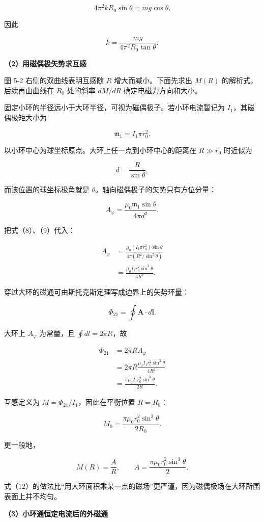 \documentclass[12pt,a4paper,UTF8]{ctexart}
\begin{document}
\[4\pi^2kR_0\sin\theta=mg\cos\theta.\]

因此

\[\boxed{k=\frac{mg}{4\pi^2R_0\tan\theta}}.\]

\textbf{（2）用磁偶极矢势求互感}

图 5-2 右侧的双曲线表明互感随 \(R\) 增大而减小。下面先求出 \(M(R)\)
的解析式，后续再由曲线在 \(R_0\) 处的斜率 \(dM/dR\)
确定电磁力方向和大小。

固定小环的半径远小于大环半径，可视为磁偶极子。若小环电流暂记为
\(I_1\)，其磁偶极矩大小为

\[\mathfrak m_1=I_1\pi r_0^2.\]

以小环中心为球坐标原点。大环上任一点到小环中心的距离在 \(R\gg r_0\)
时近似为

\[d=\frac{R}{\sin\theta},\]

而该位置的球坐标极角就是 \(\theta\)。轴向磁偶极子的矢势只有方位分量：

\[A_\varphi=\frac{\mu_0\mathfrak m_1\sin\theta}{4\pi d^2}.\]

把式（8）、（9）代入：

\[\begin{aligned}
A_\varphi
&=\frac{\mu_0(I_1\pi r_0^2)\sin\theta}
{4\pi(R^2/\sin^2\theta)}\\
&=\frac{\mu_0I_1r_0^2\sin^3\theta}{4R^2}.
\end{aligned}\]

穿过大环的磁通可由斯托克斯定理写成边界上的矢势环量：

\[\Phi_{21}=\oint\bm A\cdot d\bm l.\]

大环上 \(A_\varphi\) 为常量，且 \(\oint dl=2\pi R\)，故

\[\begin{aligned}
\Phi_{21}
&=2\pi R A_\varphi\\
&=2\pi R\frac{\mu_0I_1r_0^2\sin^3\theta}{4R^2}\\
&=\frac{\pi\mu_0I_1r_0^2\sin^3\theta}{2R}.
\end{aligned}\]

互感定义为 \(M=\Phi_{21}/I_1\)，因此在平衡位置 \(R=R_0\)：

\[\boxed{M_0=\frac{\pi\mu_0r_0^2\sin^3\theta}{2R_0}}.\]

更一般地，

\[\boxed{M(R)=\frac AR},\qquad
A=\frac{\pi\mu_0r_0^2\sin^3\theta}{2}.\]

式（12）的做法比``用大环面积乘某一点的磁场''更严谨，因为磁偶极场在大环所围表面上并不均匀。

\textbf{（3）小环通恒定电流后的外磁通}
\end{document}
